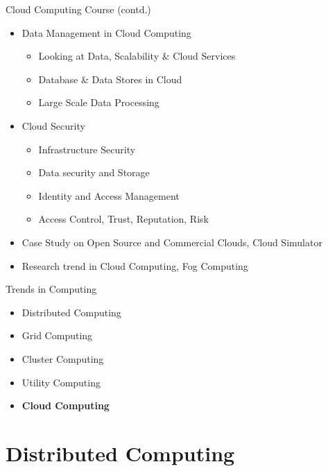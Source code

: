 \documentclass{SKP-beamer}
\begin{document}
\begin{frame}{Cloud Computing Course (contd.)}
	\begin{itemize}
		\item  Data Management in Cloud Computing
		\begin{itemize}
			\item  Looking at Data, Scalability & Cloud Services
			\item Database & Data Stores in Cloud
			\item Large Scale Data Processing
		\end{itemize}
		\item Cloud Security
		\begin{itemize}
			\item Infrastructure Security
			\item Data security and Storage
			\item Identity and Access Management
			\item Access Control, Trust, Reputation, Risk
		\end{itemize}
		\item Case Study on Open Source and Commercial Clouds, Cloud Simulator
		\item Research trend in Cloud Computing, Fog Computing
		
		
	\end{itemize}
	
\end{frame}





\begin{frame}{Trends in Computing}
		\begin{itemize}
		\item Distributed Computing
		\item Grid Computing
		\item Cluster Computing
		\item Utility Computing
		\item \textbf{Cloud Computing}
		
	\end{itemize}
\end{frame}

\section{Distributed Computing}
\end{document}
